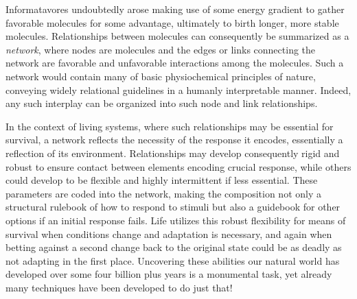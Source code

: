 Informatavores undoubtedly arose making use of some energy gradient to gather favorable molecules for some advantage, ultimately to birth longer, more stable molecules. Relationships between molecules can consequently be summarized as a \emph{network}, where nodes are molecules and the edges or links connecting the network are favorable and unfavorable interactions among the molecules. Such a network would contain many of basic physiochemical principles of nature, conveying widely relational guidelines in a humanly interpretable manner. Indeed, any such interplay can be organized into such node and link relationships.

In the context of living systems, where such relationships may be essential for survival, a network reflects the necessity of the response it encodes, essentially a reflection of its environment. Relationships may develop consequently rigid and robust to ensure contact between elements encoding crucial response, while others could develop to be flexible and highly intermittent if less essential.
These parameters are coded into the network, making the composition not only a structural rulebook of how to respond to stimuli but also a guidebook for other options if an initial response fails. 
Life utilizes this robust flexibility for means of survival when conditions change and adaptation is necessary, and again when betting against a second change back to the original state could be as deadly as not adapting in the first place. Uncovering these abilities our natural world has developed over some four billion plus years is a monumental task, yet already many techniques have been developed to do just that!

